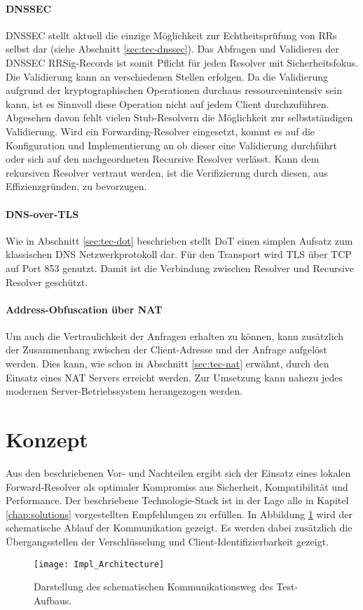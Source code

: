 \paragraph{DNSSEC}
DNSSEC stellt aktuell die einzige Möglichkeit zur Echtheitsprüfung von RRs selbst dar (siehe Abschnitt \ref{sec:tec-dnssec}). Das Abfragen und Validieren der DNSSEC RRSig-Records ist somit Pflicht für jeden Resolver mit Sicherheitsfokus. Die Validierung kann an verschiedenen Stellen erfolgen. Da die Validierung aufgrund der kryptographischen Operationen durchaus ressourcenintensiv sein kann, ist es Sinnvoll diese Operation nicht auf jedem Client durchzuführen. Abgesehen davon fehlt vielen Stub-Resolvern die Möglichkeit zur selbstständigen Validierung. Wird ein Forwarding-Resolver eingesetzt, kommt es auf die Konfiguration und Implementierung an ob dieser eine Validierung durchführt oder sich auf den nachgeordneten Recursive Resolver verlässt. Kann dem rekursiven Resolver vertraut werden, ist die Verifizierung durch diesen, aus Effizienzgründen, zu bevorzugen.

\paragraph{DNS-over-TLS}
Wie in Abschnitt \ref{sec:tec-dot} beschrieben stellt DoT einen simplen Aufsatz zum klassischen DNS Netzwerkprotokoll dar. Für den Transport wird TLS über TCP auf Port 853 genutzt\cite{rfc7858}. Damit ist die Verbindung zwischen Resolver und Recursive Resolver geschützt. 

\paragraph{Address-Obfuscation über NAT}
Um auch die Vertraulichkeit der Anfragen erhalten zu können, kann zusätzlich der Zusammenhang zwischen der Client-Adresse und der Anfrage aufgelöst werden. Dies kann, wie schon in Abschnitt \ref{sec:tec-nat} erwähnt, durch den Einsatz eines NAT Servers erreicht werden. Zur Umsetzung kann nahezu jedes modernen Server-Betriebssystem herangezogen werden.

\section{Konzept}
Aus den beschriebenen Vor- und Nachteilen ergibt sich der Einsatz eines lokalen Forward-Resolver als optimaler Kompromiss aus Sicherheit, Kompatibilität und Performance. Der beschriebene Technologie-Stack ist in der Lage alle in Kapitel \ref{chap:solutions} vorgestellten Empfehlungen zu erfüllen. In Abbildung \ref{img:impl-architecture} wird der schematische Ablauf der Kommunikation gezeigt. Es werden dabei zusätzlich die Übergangsstellen der Verschlüsselung und Client-Identifizierbarkeit gezeigt.
\begin{figure}[hb]
    \centering
    \texttt{[image: Impl\_Architecture]}
    \caption{Darstellung des schematischen Kommunikationsweg des Test-Aufbaus.}
    \label{img:impl-architecture}
\end{figure}

